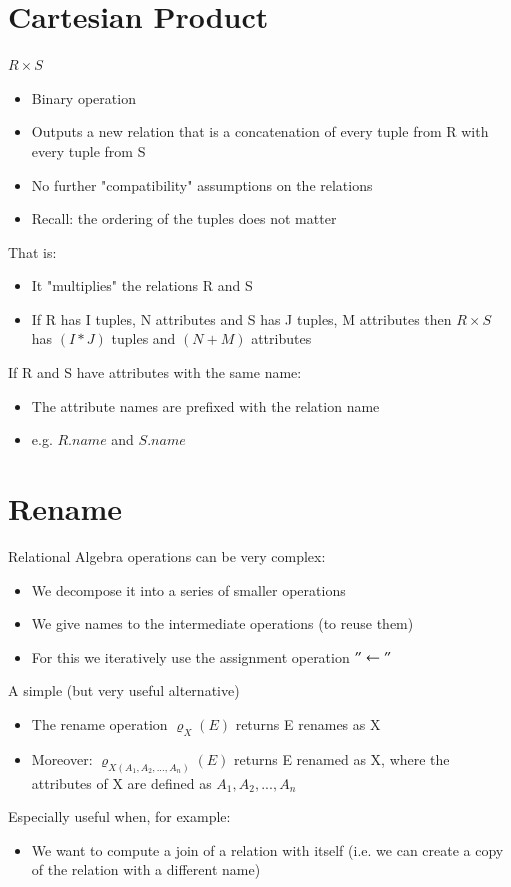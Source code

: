\documentclass{article}[18pt]
\begin{document}
\section{Cartesian Product}
$R\times S$
\begin{itemize}
	\item Binary operation
	\item Outputs a new relation that is a concatenation of every tuple from R with every tuple from S
	\item No further "compatibility" assumptions on the relations
	\item Recall: the ordering of the tuples does not matter
\end{itemize}
That is:
\begin{itemize}
	\item It "multiplies" the relations R and S
	\item If R has I tuples, N attributes and S has J tuples, M attributes then $R\times S$ has $(I*J)$ tuples and $(N+M)$ attributes
\end{itemize}
If R and S have attributes with the same name:
\begin{itemize}
	\item The attribute names are prefixed with the relation name
	\item e.g. $R.name$ and $S.name$
\end{itemize}
\section{Rename}
Relational Algebra operations can be very complex:
\begin{itemize}
	\item We decompose it into a series of smaller operations
	\item We give names to the intermediate operations (to reuse them)
	\item For this we iteratively use the assignment operation $"\leftarrow"$
\end{itemize}
A simple (but very useful alternative)
\begin{itemize}
	\item The rename operation $\varrho_X(E)$ returns E renames as X
	\item Moreover: $\varrho_{X(A_1,A_2,...,A_n)}(E)$ returns E renamed as X, where the attributes of X are defined as $A_1,A_2,...,A_n$
\end{itemize}
Especially useful when, for example:
\begin{itemize}
	\item We want to compute a join of a relation with itself (i.e. we can create a copy of the relation with a different name)
\end{itemize}
\end{document}
